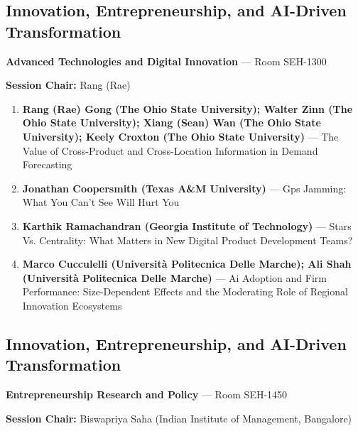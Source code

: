 \documentclass[
  10pt,
  letterpaper,
  DIV=11,
  numbers=noendperiod]{scrartcl}
\begin{document}
\subsection{\texorpdfstring{\textcolor{innovation}{Innovation, Entrepreneurship, and AI-Driven Transformation}}{}}\label{section-16}

\textbf{Advanced Technologies and Digital Innovation} --- Room SEH-1300

\textbf{Session Chair:} Rang (Rae)

\begin{enumerate}
\def\labelenumi{\arabic{enumi}.}
\item
  \textbf{Rang (Rae) Gong (The Ohio State University); Walter Zinn (The
  Ohio State University); Xiang (Sean) Wan (The Ohio State University);
  Keely Croxton (The Ohio State University)} --- The Value of
  Cross-Product and Cross-Location Information in Demand Forecasting
\item
  \textbf{Jonathan Coopersmith (Texas A\&M University)} --- Gps Jamming:
  What You Can't See Will Hurt You
\item
  \textbf{Karthik Ramachandran (Georgia Institute of Technology)} ---
  Stars Vs. Centrality: What Matters in New Digital Product Development
  Teams?
\item
  \textbf{Marco Cucculelli (Università Politecnica Delle Marche); Ali
  Shah (Università Politecnica Delle Marche)} --- Ai Adoption and Firm
  Performance: Size-Dependent Effects and the Moderating Role of
  Regional Innovation Ecosystems
\end{enumerate}

\subsection{\texorpdfstring{\textcolor{innovation}{Innovation, Entrepreneurship, and AI-Driven Transformation}}{}}\label{section-17}

\textbf{Entrepreneurship Research and Policy} --- Room SEH-1450

\textbf{Session Chair:} Biswapriya Saha (Indian Institute of Management,
Bangalore)
\end{document}
